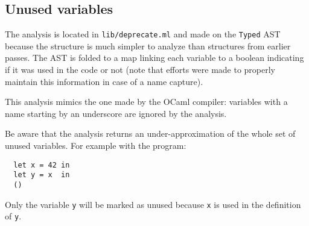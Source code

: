 \documentclass[10pt,a4paper]{article}
\begin{document}
\subsection{Unused variables}

The analysis is located in \verb|lib/deprecate.ml| and made on the
\verb|Typed| AST because the structure is much simpler to analyze than
structures from earlier passes. The AST is folded to a map linking
each variable to a boolean indicating if it was used in the code or
not (note that efforts were made to properly maintain this information
in case of a name capture).

This analysis mimics the one made by the OCaml compiler: variables
with a name starting by an underscore are ignored by the analysis.

Be aware that the analysis returns an under-approximation of the whole
set of unused variables.  For example with the program:
\begin{verbatim}
  let x = 42 in
  let y = x  in
  ()
\end{verbatim}

Only the variable \verb|y| will be marked as unused because
\verb|x| is used in the definition of \verb|y|.


{}
\end{document}
